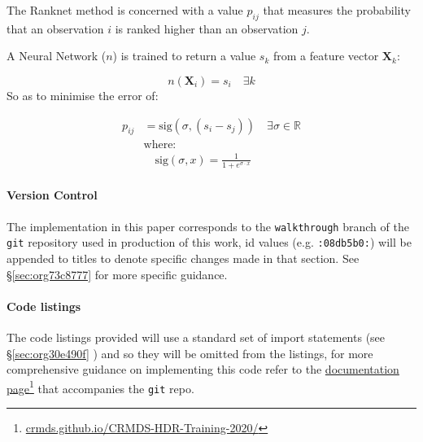 \documentclass[a4paper,11pt,twoside]{article}
\begin{document}
The Ranknet method is concerned with a value \(p_{ij}\) that
measures the probability that an observation \(i\) is ranked higher
than an observation \(j\).

A Neural Network (\(n\)) is trained to return a value
\(s_k\) from a feature vector \(\mathbf{X}_k\):

 \[n(\mathbf{X}_i) = s_i \quad \exists k\]
So as to minimise the error of:




\begin{align} 
 p_{ij} &= \mathrm{sig}\left(\sigma, (s_i-s_j) \right) \quad \exists \sigma \in \mathbb{R} \\
 &\text{where:} \nonumber \\
 &\quad  \mathrm{sig}\left(\sigma, x\right) = \frac{1}{1+e^{\sigma \cdot x}} 
\end{align} 



\paragraph{Version Control}
\label{sec:orgb3b5259}
The implementation in this paper corresponds to the \texttt{walkthrough} branch
of the \texttt{git} repository used in production of this work, id values
(e.g. \texttt{:08db5b0:}) will be appended to titles to denote specific
changes made in that section. See \S \ref{sec:org73c8777} for
more specific guidance.

\paragraph{Code listings}
\label{sec:org2a3ae73}
The code listings provided will use a standard set of import
statements (see \S \ref{sec:org30e490f} ) and so they will be
omitted from the listings, for more comprehensive guidance on
implementing this code refer to the \href{https://crmds.github.io/CRMDS-HDR-Training-2020/}{documentation page}\footnote{\href{https://crmds.github.io/CRMDS-HDR-Training-2020/}{crmds.github.io/CRMDS-HDR-Training-2020/}} that
accompanies the \texttt{git} repo.
\end{document}
